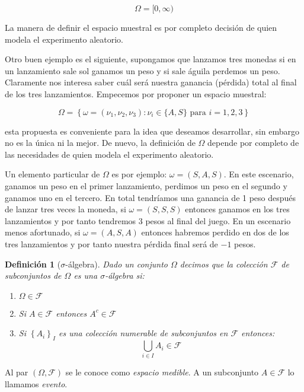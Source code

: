 \documentclass{extreport}
\theoremstyle{definicion}
\newtheorem{definition}{Definición}[chapter]
\theoremstyle{propiedad}
\begin{document}
$$
\Omega = [0,\infty)
$$

  

La manera de definir el espacio muestral es por completo decisión de quien modela el experimento aleatorio.  

Otro buen ejemplo es el siguiente, supongamos que lanzamos tres monedas si en un lanzamiento sale sol ganamos un peso y si sale águila perdemos un peso. Claramente nos interesa saber cuál será nuestra ganancia (pérdida) total al final de los tres lanzamientos. Empecemos por proponer un espacio muestral:

$$
\Omega = \left\{\omega = (\nu_1, \nu_2, \nu_3): \nu_i \in\{A,S\}\text{ para } i = 1,2,3 \right\}
$$

esta propuesta es conveniente para la idea que deseamos desarrollar, sin embargo no es la única ni la mejor. De nuevo, la definición de $\Omega$ depende por completo de las necesidades de quien modela el experimento aleatorio.

Un elemento particular de $\Omega$ es por ejemplo: $\omega = (S,A,S)$. En este escenario, ganamos un peso en el primer lanzamiento, perdimos un peso en el segundo y ganamos uno en el tercero. En total tendríamos una ganancia de 1 peso después de lanzar tres veces la moneda,  si  $\omega = (S,S,S)$ entonces ganamos en los tres lanzamientos y por tanto tendremos 3 pesos al final del juego. En un escenario menos afortunado, si $\omega = (A,S,A)$ entonces habremos perdido en dos de los tres lanzamientos y por tanto nuestra pérdida final será de $-1$ pesos. 



\begin{definition}[$\sigma$-álgebra]
    Dado un conjunto $\Omega$ decimos que la colección $\mathcal{F}$ de subconjuntos de $\Omega$ es una $\sigma$-\emph{álgebra} si:
    \begin{enumerate}
        \item $\Omega \in \mathcal{F}$
        \item Si $A\in \mathcal{F}$ entonces $A^c \in \mathcal{F}$
        \item Si $\left\{A_i\right\}_{I}$ es una colección numerable de subconjuntos en $\mathcal{F}$ entonces:
        $$
            \bigcup_{i\in I} A_i \in \mathcal{F}
        $$
    \end{enumerate}
\end{definition}
\par\noindent
Al par $(\Omega, \mathcal{F})$  se le conoce como \emph{espacio medible}. A un subconjunto $A\in \mathcal{F}$ lo llamamos \emph{evento}.
\end{document}
